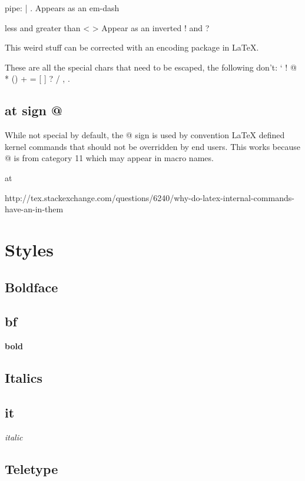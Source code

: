   \item{} pipe: | . Appears as an em-dash
  \item{} less and greater than < > Appear as an inverted ! and ?

  This weird stuff can be corrected with an encoding package in LaTeX.

  These are all the special chars that need to be escaped, the following don't: ` ! @ * () + = [  ] ? / , .

  \subsection{at sign @}

    While not special by default, the @ sign is used by convention LaTeX defined kernel commands that should not be overridden by end users. This works because @ is from category 11 which may appear in macro names.

    \def\@{at}

    \@

    http://tex.stackexchange.com/questions/6240/why-do-latex-internal-commands-have-an-in-them

\section{Styles}

  \subsection{Boldface}

  \subsection{bf}

    {\bf bold}

  \subsection{Italics}

  \subsection{it}

    {\it italic}

  \subsection{Teletype}

